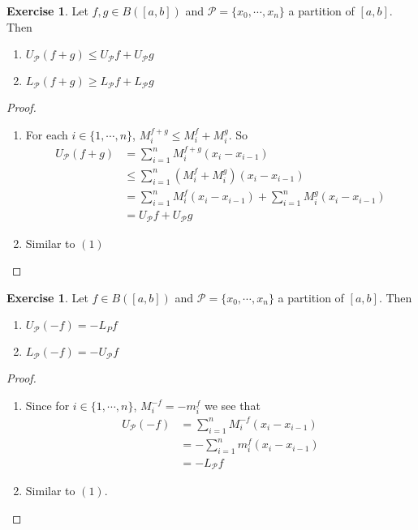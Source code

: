 \documentclass{book}
\theoremstyle{definition}
\newtheorem{ex}[definition]{Exercise}
\newcommand{\MP}{\mathcal{P}}
\newcommand{\lex}[1]{\label{ex:#1}}
\DeclareMathOperator*{\0}{\mbf{0}}
\DeclareMathOperator*{\1}{\mbf{1}}
\begin{document}
	\begin{ex} \lex{00000} 
		Let $f, g \in B([a,b])$ and $\MP = \{x_0, \cdots, x_n\}$ a partition of $[a,b]$. Then 
		\begin{enumerate}
			\item $U_\MP(f+g) \leq U_\MP f + U_\MP g$
			\item $L_\MP(f+g) \geq L_\MP f + L_\MP g$
		\end{enumerate}
	\end{ex}

	\begin{proof} \
		\begin{enumerate}
			\item For each $i \in \{1, \cdots, n\}$, $M^{f+g}_i \leq M^f_i + M^g_i$. So 
			\begin{align*}
				U_\MP (f+g) 
				&= \sum_{i=1}^n M^{f+g}_i (x_i - x_{i-1}) \\
				& \leq \sum_{i=1}^n (M^f_i + M^g_i)(x_i - x_{i-1}) \\
				&= \sum_{i=1}^n M^f_i(x_i - x_{i-1}) + \sum_{i=1}^n M^g_i(x_i - x_{i-1}) \\
				&= U_\MP f + U_\MP g
			\end{align*}
			\item Similar to $(1)$
		\end{enumerate}
	\end{proof}

	\begin{ex} \lex{00000} 
		Let $f \in B([a,b])$ and $\MP = \{x_0, \cdots, x_n\}$ a partition of $[a,b]$. Then 
		\begin{enumerate}
			\item $U_\MP (-f) = -L_P f$
			\item $L_\MP (-f) = - U_\MP f$
		\end{enumerate}
	\end{ex}

	\begin{proof}\
		\begin{enumerate}
			\item Since for $i \in \{1, \cdots, n\}$, $M^{-f}_i = -m^f_i$ we see that 
			\begin{align*}
				U_\MP(-f) 
				&= \sum_{i=1}^n M^{-f}_i(x_i - x_{i-1}) \\
				&= - \sum_{i=1}^n m^f_i(x_i - x_{i-1}) \\
				&= - L_\MP f
			\end{align*}
			\item Similar to $(1)$.
		\end{enumerate}
	\end{proof}
\end{document}
